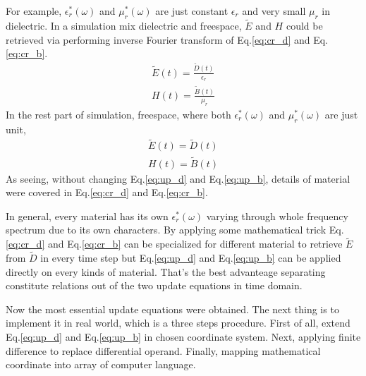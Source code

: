 For example, $\epsilon_r^*(\omega)$ and $\mu_r^*(\omega)$ are just constant $\epsilon_r$ and very small $\mu_r$ in
dielectric. In a simulation mix dielectric and freespace, $\widetilde{E}$ and $H$ could be retrieved via performing
inverse Fourier transform of Eq.\ref{eq:cr_d} and Eq.\ref{eq:cr_b}.
\begin{gather*}
  \widetilde{E}(t) = \frac{\widetilde{D}(t)}{\epsilon_r}\\
  H(t) = \frac{\widetilde{B}(t)}{\mu_r}
\end{gather*}
In the rest part of simulation, freespace, where both $\epsilon_r^*(\omega)$ and $\mu_r^*(\omega)$ are just unit, 
\begin{gather*}
  \widetilde{E}(t) = \widetilde{D}(t)\\
  H(t) = \widetilde{B}(t)
\end{gather*}
As seeing, without changing Eq.\ref{eq:up_d} and Eq.\ref{eq:up_b}, details of material were covered in Eq.\ref{eq:cr_d}
and Eq.\ref{eq:cr_b}.

In general, every material has its own $\epsilon_r^*(\omega)$ varying through whole frequency spectrum due to its own
characters. By applying some mathematical trick Eq.\ref{eq:cr_d} and Eq.\ref{eq:cr_b} can be specialized for different
material to retrieve $\widetilde{E}$ from $\widetilde{D}$ in every time step but Eq.\ref{eq:up_d} and Eq.\ref{eq:up_b}
can be applied directly on every kinds of material. That's the best advanteage separating constitute relations out of
the two update equations in time domain.

Now the most essential update equations were obtained. The next thing is to implement it in real world, which is a three
steps procedure. First of all, extend Eq.\ref{eq:up_d} and Eq.\ref{eq:up_b} in chosen coordinate system. Next, applying
finite difference to replace differential operand. Finally, mapping mathematical coordinate into array of computer
language.

